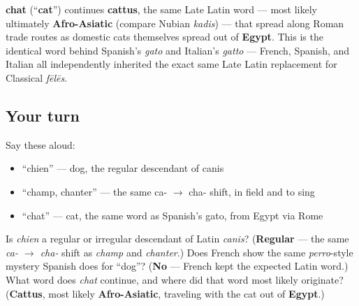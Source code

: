 \begin{cousinweb}
\textbf{chat} (\textquotedblleft{}\textbf{cat}\textquotedblright{}) continues \textbf{cattus}, the same Late Latin word — most likely ultimately \textbf{Afro-Asiatic} (compare Nubian \emph{kadis}) — that spread along Roman trade routes as domestic cats themselves spread out of \textbf{Egypt}. This is the identical word behind Spanish's \emph{gato} and Italian's \emph{gatto} — French, Spanish, and Italian all independently inherited the exact same Late Latin replacement for Classical \emph{fēlēs}.
\end{cousinweb}

\subsection*{Your turn}
Say these aloud:

\begin{itemize}
\raggedright
  \item \textquotedblleft{}chien\textquotedblright{} — dog, the regular descendant of canis
  \item \textquotedblleft{}champ, chanter\textquotedblright{} — the same ca- $\to$ cha- shift, in field and to sing
  \item \textquotedblleft{}chat\textquotedblright{} — cat, the same word as Spanish's gato, from Egypt via Rome
\end{itemize}

\begin{tcolorbox}[breakable,colback=teal!4,colframe=teal!35!black,title={Before you move on}]
Is \emph{chien} a regular or irregular descendant of Latin \emph{canis}? (\textbf{Regular} — the same \emph{ca- $\to$ cha-} shift as \emph{champ} and \emph{chanter}.) Does French show the same \emph{perro}-style mystery Spanish does for \textquotedblleft{}dog\textquotedblright{}? (\textbf{No} — French kept the expected Latin word.) What word does \emph{chat} continue, and where did that word most likely originate? (\textbf{Cattus}, most likely \textbf{Afro-Asiatic}, traveling with the cat out of \textbf{Egypt}.)
\end{tcolorbox}
